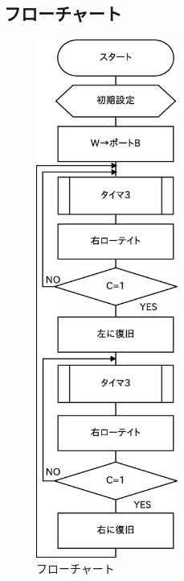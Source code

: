 \documentclass[a4paper,12pt]{ujarticle}
\begin{document}
  \subsection{フローチャート}
  \begin{figure}[htbp]
   \begin{center}
    \includegraphics[height=170mm]{Diagram5-6.eps}
   \end{center}
   \caption{フローチャート}
   \label{fig}
  \end{figure}
  \clearpage
\end{document}
